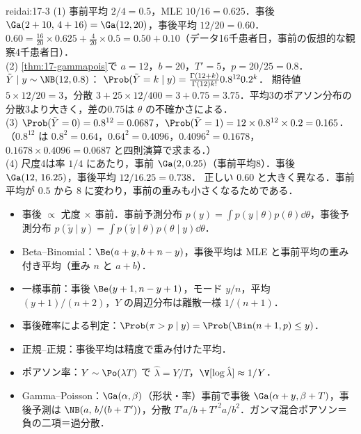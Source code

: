 \begin{kaitou}{reidai:17-3}
(1) 事前平均 $2/4=0.5$，MLE $10/16=0.625$．事後 $\Ga(2+10,\,4+16)=\Ga(12,20)$，事後平均 $12/20=0.60$．
$0.60=\frac{16}{20}\times0.625+\frac{4}{20}\times0.5=0.50+0.10$（データ16千患者日，事前の仮想的な観察4千患者日）．\\
(2) \cref{thm:17-gammapois}で $a=12$，$b=20$，$T'=5$，$p=20/25=0.8$．$\tilde Y\mid y\sim\NB(12,0.8)$：
$\Prob(\tilde Y=k\mid y)=\frac{\Gamma(12+k)}{\Gamma(12)k!}0.8^{12}0.2^k$．
期待値 $5\times12/20=3$，分散 $3+25\times12/400=3+0.75=3.75$．平均3のポアソン分布の分散3より大きく，差の0.75は $\theta$ の不確かさによる．\\
(3) $\Prob(\tilde Y=0)=0.8^{12}=0.0687$，$\Prob(\tilde Y=1)=12\times0.8^{12}\times0.2=0.165$．
（$0.8^{12}$ は $0.8^2=0.64$，$0.64^2=0.4096$，$0.4096^2=0.1678$，$0.1678\times0.4096=0.0687$ と四則演算で求まる．）\\
(4) 尺度4は率 $1/4$ にあたり，事前 $\Ga(2,0.25)$（事前平均8）．事後 $\Ga(12,\,16.25)$，事後平均 $12/16.25=0.738$．
正しい $0.60$ と大きく異なる．事前平均が $0.5$ から $8$ に変わり，事前の重みも小さくなるためである．
\end{kaitou}

\begin{summarybox}
\begin{itemize}
\item 事後 $\propto$ 尤度 $\times$ 事前．事前予測分布 $p(y)=\int p(y\mid\theta)p(\theta)\dd\theta$，事後予測分布 $p(\tilde y\mid y)=\int p(\tilde y\mid\theta)p(\theta\mid y)\dd\theta$．
\item Beta--Binomial：$\Be(a+y,b+n-y)$，事後平均は MLE と事前平均の重み付き平均（重み $n$ と $a+b$）．
\item 一様事前：事後 $\Be(y+1,n-y+1)$，モード $y/n$，平均 $(y+1)/(n+2)$，$Y$ の周辺分布は離散一様 $1/(n+1)$．
\item 事後確率による判定：$\Prob(\pi>p\mid y)=\Prob(\Bin(n+1,p)\le y)$．
\item 正規--正規：事後平均は精度で重み付けた平均．
\item ポアソン率：$Y\sim\Po(\lambda T)$ で $\hat\lambda=Y/T$，$\V[\log\hat\lambda]\approx1/Y$．
\item Gamma--Poisson：$\Ga(\alpha,\beta)$（形状・率）事前で事後 $\Ga(\alpha+y,\beta+T)$，事後予測は $\NB(a,\,b/(b+T'))$，分散 $T'a/b+T'^2a/b^2$．ガンマ混合ポアソン＝負の二項＝過分散．
\end{itemize}
\end{summarybox}
